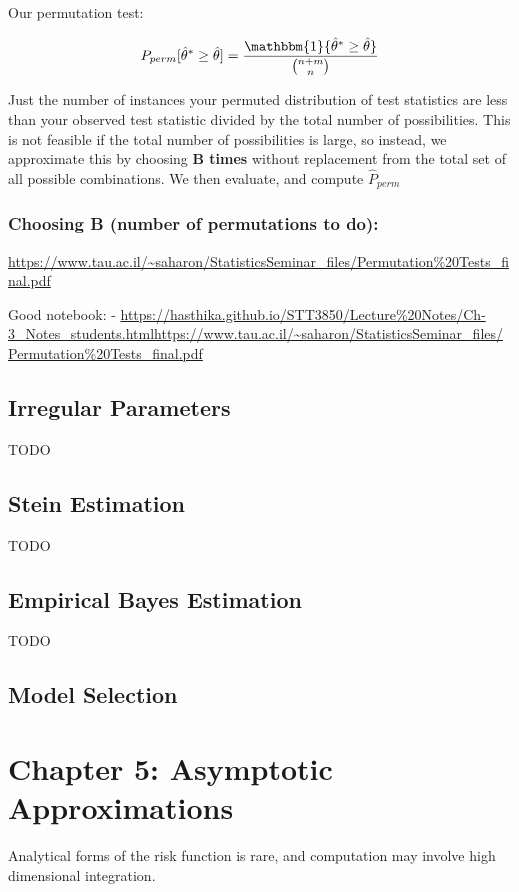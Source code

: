 \documentclass{article}
\begin{document}
			Our permutation test:

			$$P_{perm} [ \hat{\theta}^* \ge \hat{\theta}] = \frac{\mathbbm{1} \{\hat{\theta}^* \ge \hat{\theta} \}}{\binom{n+m}{n}}$$

			Just the number of instances your permuted distribution of test statistics are less than your observed test statistic divided by the total number of possibilities. This is not feasible if the total number of possibilities is large, so instead, we approximate this by choosing \textbf{B times} without replacement from the total set of all possible combinations. We then evaluate, and compute $\hat{P}_{perm}$

		\subsubsection{Choosing B (number of permutations to do):}

		\url{https://www.tau.ac.il/~saharon/StatisticsSeminar_files/Permutation%20Tests_final.pdf}



		Good notebook: 
		- \url{https://hasthika.github.io/STT3850/Lecture%20Notes/Ch-3_Notes_students.htmlhttps://www.tau.ac.il/~saharon/StatisticsSeminar_files/Permutation%20Tests_final.pdf}

	\subsection{Irregular Parameters}

		TODO

	\subsection{Stein Estimation}

		TODO

	\subsection{Empirical Bayes Estimation}

		TODO

	\subsection{Model Selection}
  	

\section{Chapter 5: Asymptotic Approximations}
  \label{sec:chapterfive}
  	Analytical forms of the risk function is rare, and computation may involve high dimensional integration.
\end{document}
